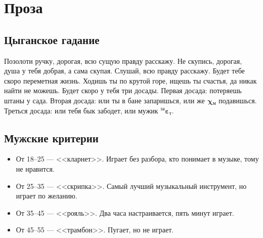 \documentclass[a4paper,oneside,14pt]{scrbook}
\newcommand{\myEbt}[2]{$^{\text{#1}}${\large{$\boldsymbol{\varepsilon}$}}$_{\text{#2}}$}
\newcommand{\myXyi}[2]{$^{\text{#1}}${\large{$\boldsymbol{\chi}$}}$_{\text{#2}}$}
\begin{document}
    
    \chapter{Проза}

    \section{Цыганское гадание}
    
    Позолоти ручку, дорогая, всю сущую правду расскажу. Не скупись, дорогая, душа у тебя добрая, а сама скупая. Слушай, всю правду расскажу. Будет тебе скоро переметная жизнь. Ходишь ты по крутой горе, ищешь ты счастья, да никак найти не можешь. Будет скоро у тебя три досады. Первая досада: потеряешь штаны у сада. Вторая досада: или ты в бане запаришься, или же {\myXyi{}{м}} подавишься. Треться досада: или тебя бык забодет, или мужик {\myEbt{за}{т}}.
    
    \section{Мужские критерии}
    \begin{itemize}
        \item От 18--25 --- <<кларнет>>. Играет без разбора, кто понимает в музыке, тому не нравится.
        \item От 25--35 --- <<скрипка>>. Самый лучший музыкальный инструмент, но играет по желанию.
        \item От 35--45 --- <<рояль>>. Два часа настраивается, пять минут играет.
        \item От 45--55 --- <<трамбон>>. Пугает, но не играет.
    \end{itemize}
\end{document}
